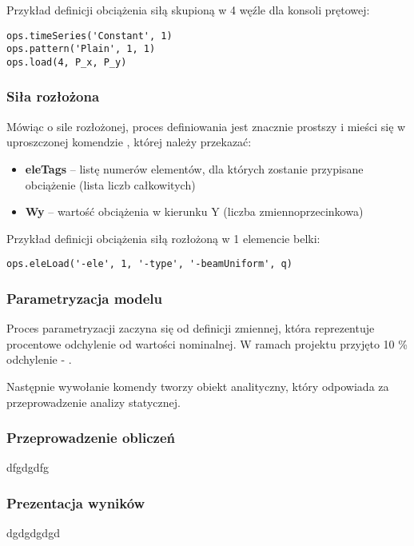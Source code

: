Przykład definicji obciążenia siłą skupioną w 4 węźle dla konsoli prętowej:
\begin{lstlisting}
ops.timeSeries('Constant', 1)
ops.pattern('Plain', 1, 1)
ops.load(4, P_x, P_y)
\end{lstlisting}

\subsubsection*{Siła rozłożona}

Mówiąc o sile rozłożonej, proces definiowania jest znacznie prostszy i mieści się w uproszczonej komendzie
, której należy przekazać:

\begin{itemize}
    \item \textbf{eleTags} – listę numerów elementów, dla których zostanie przypisane obciążenie (lista liczb całkowitych)
    \item \textbf{Wy} – wartość obciążenia w kierunku Y (liczba zmiennoprzecinkowa)
\end{itemize}

Przykład definicji obciążenia siłą rozłożoną w 1 elemencie belki:
\begin{lstlisting}
ops.eleLoad('-ele', 1, '-type', '-beamUniform', q)
\end{lstlisting}

\subsubsection{Parametryzacja modelu}

Proces parametryzacji zaczyna się od definicji zmiennej, która reprezentuje procentowe odchylenie od wartości nominalnej.
W ramach projektu przyjęto 10 \% odchylenie - .

Następnie wywołanie komendy  tworzy obiekt analityczny, który odpowiada za przeprowadzenie analizy statycznej.

\subsubsection{Przeprowadzenie obliczeń}

dfgdgdfg

\subsubsection{Prezentacja wyników}

dgdgdgdgd

